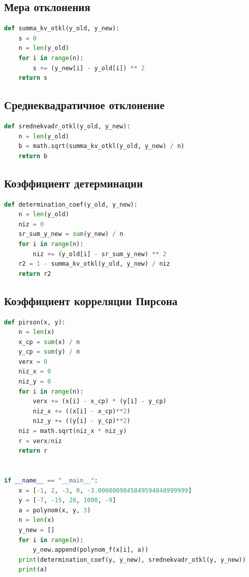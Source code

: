 \documentclass[12pt,a4paper]{article}
\begin{document}
\subsection*{Мера отклонения}
\begin{lstlisting}[language=Python,caption={Функция \texttt{summa\_kv\_otkl}}]
def summa_kv_otkl(y_old, y_new):
    s = 0
    n = len(y_old)
    for i in range(n):
        s += (y_new[i] - y_old[i]) ** 2
    return s
\end{lstlisting}

\subsection*{Среднеквадратичное отклонение}
\begin{lstlisting}[language=Python,caption={Функция \texttt{srednekvadr\_otkl}}]
def srednekvadr_otkl(y_old, y_new):
    n = len(y_old)
    b = math.sqrt(summa_kv_otkl(y_old, y_new) / n)
    return b
\end{lstlisting}

\subsection*{Коэффициент детерминации}
\begin{lstlisting}[language=Python,caption={Функция \texttt{determination\_coef}}]
def determination_coef(y_old, y_new):
    n = len(y_old)
    niz = 0
    sr_sum_y_new = sum(y_new) / n
    for i in range(n):
        niz += (y_old[i] - sr_sum_y_new) ** 2
    r2 = 1 - summa_kv_otkl(y_old, y_new) / niz
    return r2
\end{lstlisting}

\subsection*{Коэффициент корреляции Пирсона}
\begin{lstlisting}[language=Python,caption={Функция \texttt{pirson}}]
def pirson(x, y):
    n = len(x)
    x_cp = sum(x) / n
    y_cp = sum(y) / n
    verx = 0
    niz_x = 0
    niz_y = 0
    for i in range(n):
        verx += (x[i] - x_cp) * (y[i] - y_cp)
        niz_x += ((x[i] - x_cp)**2)
        niz_y += ((y[i] - y_cp)**2)
    niz = math.sqrt(niz_x * niz_y)
    r = verx/niz
    return r


if __name__ == "__main__":
    x = [-1, 2, -3, 0, -3.0000009845849594848999999]
    y = [-7, -15, 28, 1000, -9]
    a = polynom(x, y, 3)
    n = len(x)
    y_new = []
    for i in range(n):
        y_new.append(polynom_f(x[i], a))
    print(determination_coef(y, y_new), srednekvadr_otkl(y, y_new))
    print(a)
\end{lstlisting}
\end{document}
